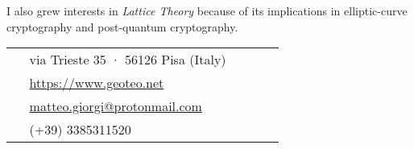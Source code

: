 \documentclass[10pt]{article} %
\begin{document}
\begin{paracol}{2}
\medskip
I also grew interests in \textit{Lattice Theory} because of its implications in elliptic-curve cryptography and post-quantum cryptography.





\switchcolumn %


\parbox[top][0.12\textheight][c]{\linewidth}{ %
	\vspace{-0.04\textheight} %
	\colorbox{shade}{ %
		\begin{supertabular}{p{0.05\linewidth}|p{0.775\linewidth}} %
			\raisebox{-1pt}{\faHome} & via Trieste 35 · 56126 Pisa (Italy) \\ %
			\raisebox{-1pt}{\small\faDesktop} & \href{https://www.geoteo.net}{https://www.geoteo.net} \\ %
			\raisebox{0pt}{\small\faEnvelope} & \href{mailto:matteo.giorgi@protonmail.com}{matteo.giorgi@protonmail.com} \\ %
			\raisebox{-1pt}{\faPhoneSquare} & (+39) 3385311520 \\ %
		\end{supertabular}
	}
}



\end{paracol}
\end{document}
